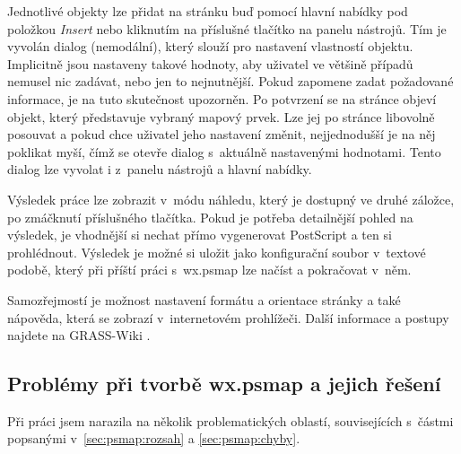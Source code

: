 \documentclass[a4paper,12pt,draft]{article}
\begin{document}
Jednotlivé objekty lze přidat na stránku buď pomocí hlavní nabídky
pod polož\-kou \emph{Insert} nebo kliknutím na příslušné tlačítko na
panelu nástrojů. Tím je vyvolán dialog (nemodální), který slouží
pro nastavení vlastností objektu. Implicitně jsou nastaveny takové
hodnoty, aby uživatel ve většině případů nemusel nic zadávat, nebo
jen to nejnutnější. Pokud zapomene zadat požadované informace, je na
tuto skutečnost upozorněn. Po potvrzení se na stránce objeví objekt,
který představuje vybraný mapový prvek. Lze jej po stránce libovolně
posouvat a pokud chce uživatel jeho nastavení změnit, nejjednodušší je
na něj poklikat myší, čímž se otevře dialog s~aktuálně nastavenými
hodnotami. Tento dialog lze vyvolat i z~panelu nástrojů a hlavní nabídky.

Výsledek práce lze zobrazit v~módu náhledu, který je dostupný ve
druhé záložce, po zmáčknutí příslušného tlačítka. Pokud je
potřeba detailnější pohled na výsledek, je vhodnější si nechat přímo
vygenerovat PostScript a ten si prohlédnout. Výsledek je možné si uložit
jako konfigurační soubor v~textové podobě, který při příští práci
s~wx.psmap lze načíst a pokračovat v~něm.

Samozřejmostí je možnost nastavení formátu a orientace stránky a
také nápo\-věda, která se zobrazí v~internetovém prohlížeči. Další
informace a postupy najdete na GRASS-Wiki \cite{wiki_wxpsmap}. 


\subsection[Problémy při tvorbě wx.psmap]{Problémy při tvorbě wx.psmap
a jejich řešení}
\label{sec:gui:problemy}
Při práci jsem narazila na několik problematických oblastí,
 souvisejících s~částmi popsanými v~\ref{sec:psmap:rozsah} a
\ref{sec:psmap:chyby}.
\end{document}
